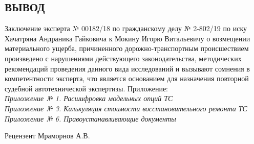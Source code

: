 \subsection{ ВЫВОД}

Заключение эксперта № 00182/18 по гражданскому делу № 2-802/19 по иску Хачатряна Андраника Гайковича к Мокину Игорю Витальевичу о возмещении материального ущерба, причиненного дорожно-транспортным происшествием произведено с нарушениями действующего законодательства, методических рекомендаций проведения данного вида исследований и вызывают сомнения в компетентности эксперта,  что является основанием для назначения повторной судебной автотехнической экспертизы.\textbf{}
\vspace{7mm}
\relax
Приложение:\\
\vspace{3mm}
\textit{\small 
\noindent	Приложение № 1. Расшифровка модельных опций ТС  \\
	Приложение № 3. Калькуляция стоимости восстановительного ремонта ТС \\
	Приложение № 6. Правоустанавливающие документы\\}


\vspace{15mm}


\noindent Рецензент \hfill  \underbar{ }Мраморнов А.В.

\vspace{20mm}



%

%
